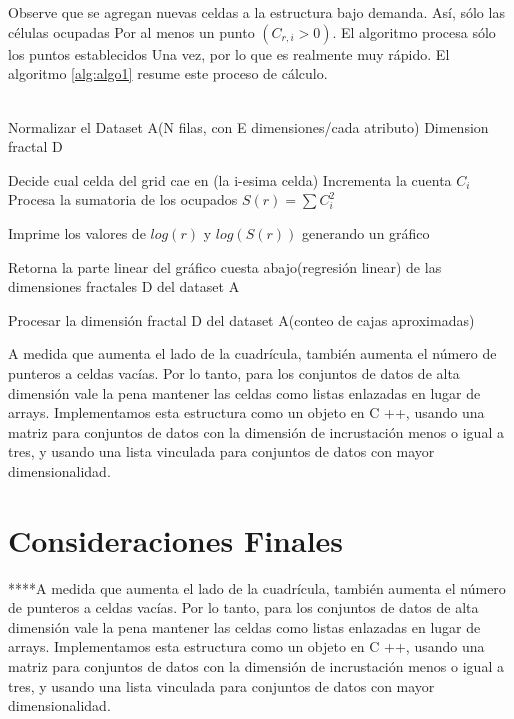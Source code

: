 \\\\
Observe que se agregan nuevas celdas a la estructura bajo demanda. Así, sólo las células ocupadas
Por al menos un punto $(C_{r,i}> 0)$. El algoritmo procesa sólo los puntos establecidos
Una vez, por lo que es realmente muy rápido. El algoritmo \ref{alg:algo1} resume este proceso de cálculo.
\\\\
\begin{algorithm}
\begin{algorithmic}[1]
\REQUIRE Normalizar el Dataset A(N filas, con E dimensiones/cada atributo)
\label{lin:lineaRara}
\ENSURE  Dimension fractal D

    \STATE Decide cual celda del grid cae en (la i-esima celda)
    \STATE Incrementa la cuenta $C_i$
    \ENDFOR
    \STATE Procesa la sumatoria de los ocupados $S(r) = \sum C_i^2$
\ENDFOR

\STATE Imprime los valores de $log(r)$ y $log(S(r))$ generando un gráfico

\STATE Retorna la parte linear del gráfico cuesta abajo(regresión linear) de las dimensiones fractales D del dataset A

\end{algorithmic}
\caption{Procesar la dimensión fractal D del dataset A(conteo de cajas aproximadas)}
\label{alg:algo1}
\end{algorithm}
 
A medida que aumenta el lado de la cuadrícula, también aumenta el número de punteros a celdas vacías. Por lo tanto, para los conjuntos de datos de alta dimensión vale la pena mantener las celdas como listas enlazadas en lugar de arrays. Implementamos esta estructura como un objeto en C ++, usando una matriz para conjuntos de datos con la dimensión de incrustación menos o igual a tres, y usando una lista vinculada para conjuntos de datos con mayor dimensionalidad.	\\


\section{Consideraciones Finales}

****A medida que aumenta el lado de la cuadrícula, también aumenta el número de punteros a celdas vacías. Por lo tanto, para los conjuntos de datos de alta dimensión vale la pena mantener las celdas como listas enlazadas en lugar de arrays. Implementamos esta estructura como un objeto en C ++, usando una matriz para conjuntos de datos con la dimensión de incrustación menos o igual a tres, y usando una lista vinculada para conjuntos de datos con mayor dimensionalidad.	\\

